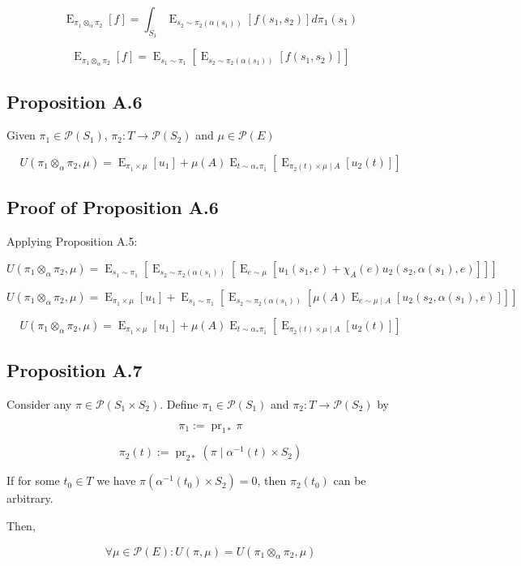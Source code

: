 \documentclass[a4paper]{article}
\DeclareMathOperator{\E}{E}
\DeclareMathOperator{\Prj}{pr}
\newcommand{\Prob}{\mathcal{P}}
\begin{document}
$$\E_{\pi_1 \otimes_\alpha \pi_2}[f] = \int_{S_1} \E_{s_2 \sim \pi_2(\alpha(s_1))}[f(s_1,s_2)] d\pi_1(s_1)$$

$$\E_{\pi_1 \otimes_\alpha \pi_2}[f] = \E_{s_1 \sim \pi_1}[\E_{s_2 \sim \pi_2(\alpha(s_1))}[f(s_1, s_2)]]$$

\subsection{Proposition A.6}

Given ${\pi_1 \in \Prob(S_1)}$, ${\pi_2: T \rightarrow \Prob(S_2)}$ and ${\mu \in \Prob(E)}$

$$U(\pi_1 \otimes_\alpha \pi_2, \mu) = \E_{\pi_1 \times \mu}[u_1] + \mu(A) \E_{t \sim \alpha_*\pi_1}[\E_{\pi_2(t) \times \mu \mid A}[u_2(t)]]$$

\subsection{Proof of Proposition A.6}

Applying Proposition A.5:

$$U(\pi_1 \otimes_\alpha \pi_2, \mu) = \E_{s_1 \sim \pi_1}[\E_{s_2 \sim \pi_2(\alpha(s_1))}[\E_{e \sim \mu}[u_1(s_1,e)+\chi_A(e) u_2(s_2,\alpha(s_1),e)]]]$$

$$U(\pi_1 \otimes_\alpha \pi_2, \mu) = \E_{\pi_1 \times \mu}[u_1] + \E_{s_1 \sim \pi_1}[\E_{s_2 \sim \pi_2(\alpha(s_1))}[\mu(A) \E_{e \sim \mu \mid A}[u_2(s_2,\alpha(s_1),e)]]]$$

$$U(\pi_1 \otimes_\alpha \pi_2, \mu) = \E_{\pi_1 \times \mu}[u_1] + \mu(A) \E_{t \sim \alpha_*\pi_1}[\E_{\pi_2(t) \times \mu \mid A}[u_2(t)]]$$

\subsection{Proposition A.7}

Consider any ${\pi \in \Prob(S_1 \times S_2)}$. Define ${\pi_1 \in \Prob(S_1)}$ and ${\pi_2: T \rightarrow \Prob(S_2)}$ by

$$\pi_1 := \Prj_{1*}\pi$$

$$\pi_2(t) := \Prj_{2*} (\pi \mid \alpha^{-1}(t) \times S_2)$$

If for some ${t_0 \in T}$ we have ${\pi(\alpha^{-1}(t_0) \times S_2)=0}$, then ${\pi_2(t_0)}$ can be arbitrary.

Then,

$$\forall \mu \in \Prob(E):U(\pi,\mu)=U(\pi_1 \otimes_\alpha \pi_2, \mu)$$
\end{document}
